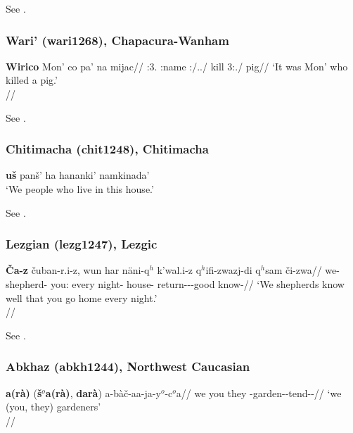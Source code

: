See \citet[28]{costello1969}.

\subsubsection{Wari' (wari1268), Chapacura-Wanham}

\ex \begingl
\gla \textbf{Wirico} Mon' co pa' na mijac//
\glb \Emph:3\Sg.\M{} \M:name \Infl:\M/\F.\Real.\Pst/\Prs{} kill 3\Sg:\Real.\Pst/\Prs{} pig//
\glft `It was Mon' who killed a pig.'\\\citep[after][303, (570a)]{everettkern1997}//
\endgl
\xe

See \citet[303, 310]{everettkern1997}.

\newpage

\subsubsection{Chitimacha (chit1248), Chitimacha}

\ex \textbf{\textglotstop{}u\v{s}} pan\v{s}' ha hananki' namkinada'\\
`We people who live in this house.'\\
\citep[333]{swadesh1967}\xe

See \citet[333]{swadesh1967}.

\subsubsection{Lezgian (lezg1247), Lezgic}

\ex 
\begingl
\gla \textbf{\v{C}a-z} \v{c}uban-r.i-z, wun har näni-q$^h$ k'wal.i-z q$^h$ifi-zwazj-di q$^h$sam \v{c}i-zwa//
\glb we-\Dat{} shepherd-\Dat{} you:\Abs{} every night-\Postess{} house-\Dat{} return-\Ipfv-\Ptcp-\Nmlz good know-\Ipfv//
\glft `We shepherds know well that you go home every night.' \\\citep[after][259, (682a)]{haspelmath1993}//
\endgl
\xe

See \citet[259]{haspelmath1993}.

\subsubsection{Abkhaz (abkh1244), Northwest Caucasian}

\ex 
\begingl
\gla \textbf{\textcrh{}a(rà)} (\textbf{\v{s}$^o$a(rà)}, \textbf{darà}) a-bà\textcrh\v{c}-aa-ja-y$^o$-c$^o$a//
\glb we you they \Art-garden-\Prev-tend-\Aarg{}-\Pl//
\glft `we (you, they) gardeners' \\\citep[159]{hewitt1989}//
\endgl
\xe

